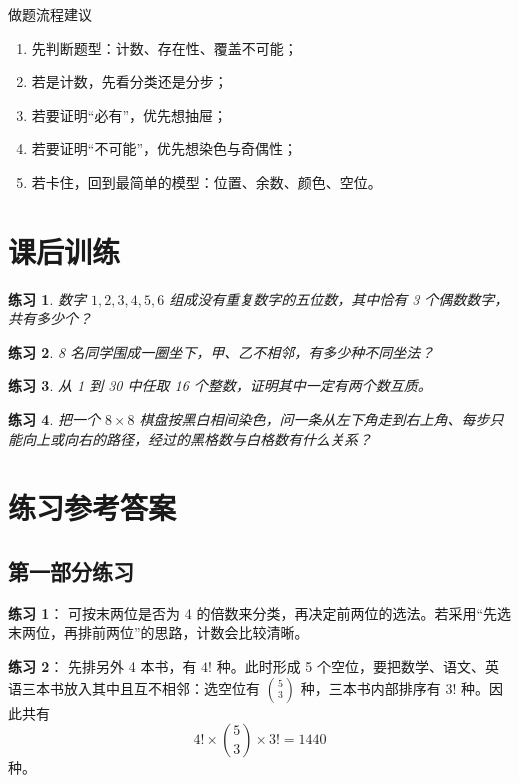 \documentclass[11pt,a4paper,fontset=fandol]{ctexart}
\theoremstyle{formaltheorem}
\theoremstyle{formalexample}
\newtheorem{exercise}{练习}[section]
\begin{document}
\begin{skillbox}{做题流程建议}
\begin{enumerate}
  \item 先判断题型：计数、存在性、覆盖不可能；
  \item 若是计数，先看分类还是分步；
  \item 若要证明“必有”，优先想抽屉；
  \item 若要证明“不可能”，优先想染色与奇偶性；
  \item 若卡住，回到最简单的模型：位置、余数、颜色、空位。
\end{enumerate}
\end{skillbox}

\section{课后训练}

\begin{exercise}
数字 $1,2,3,4,5,6$ 组成没有重复数字的五位数，其中恰有 3 个偶数数字，共有多少个？
\end{exercise}

\begin{exercise}
8 名同学围成一圈坐下，甲、乙不相邻，有多少种不同坐法？
\end{exercise}

\begin{exercise}
从 1 到 30 中任取 16 个整数，证明其中一定有两个数互质。
\end{exercise}

\begin{exercise}
把一个 $8\times 8$ 棋盘按黑白相间染色，问一条从左下角走到右上角、每步只能向上或向右的路径，经过的黑格数与白格数有什么关系？
\end{exercise}

\newpage
\appendix
\section{练习参考答案}

\subsection*{第一部分练习}

\textbf{练习 1}：
可按末两位是否为 4 的倍数来分类，再决定前两位的选法。若采用“先选末两位，再排前两位”的思路，计数会比较清晰。

\textbf{练习 2}：
先排另外 4 本书，有 $4!$ 种。此时形成 5 个空位，要把数学、语文、英语三本书放入其中且互不相邻：选空位有 $\binom{5}{3}$ 种，三本书内部排序有 $3!$ 种。因此共有
\[
4!\times \binom{5}{3}\times 3!=1440
\]
种。
\end{document}
